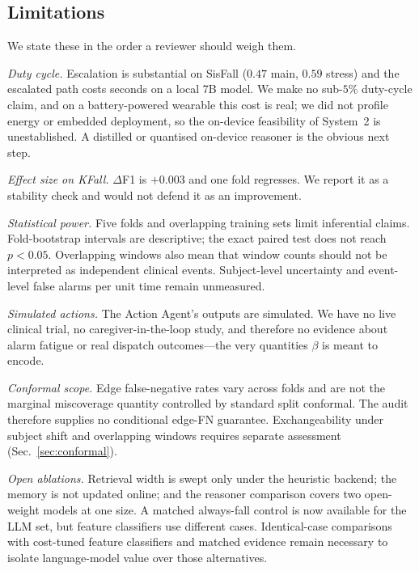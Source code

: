 \documentclass[journal]{IEEEtran}
\begin{document}


\subsection{Limitations}
\label{sec:limitations}
We state these in the order a reviewer should weigh them.

\emph{Duty cycle.} Escalation is substantial on SisFall ($0.47$ main, $0.59$ stress) and the escalated path costs seconds on a local 7B model. We make no sub-$5\%$ duty-cycle claim, and on a battery-powered wearable this cost is real; we did not profile energy or embedded deployment, so the on-device feasibility of System~2 is unestablished. A distilled or quantised on-device reasoner is the obvious next step.

\emph{Effect size on KFall.} $\Delta$F1 is $+0.003$ and one fold regresses. We report it as a stability check and would not defend it as an improvement.

\emph{Statistical power.} Five folds and overlapping training sets limit inferential claims. Fold-bootstrap intervals are descriptive; the exact paired test does not reach $p<0.05$. Overlapping windows also mean that window counts should not be interpreted as independent clinical events. Subject-level uncertainty and event-level false alarms per unit time remain unmeasured.

\emph{Simulated actions.} The Action Agent's outputs are simulated. We have no live clinical trial, no caregiver-in-the-loop study, and therefore no evidence about alarm fatigue or real dispatch outcomes---the very quantities $\beta$ is meant to encode.

\emph{Conformal scope.} Edge false-negative rates vary across folds and are not the marginal miscoverage quantity controlled by standard split conformal. The audit therefore supplies no conditional edge-FN guarantee. Exchangeability under subject shift and overlapping windows requires separate assessment (Sec.~\ref{sec:conformal}).

\emph{Open ablations.} Retrieval width is swept only under the heuristic backend; the memory is not updated online; and the reasoner comparison covers two open-weight models at one size. A matched always-fall control is now available for the LLM set, but feature classifiers use different cases. Identical-case comparisons with cost-tuned feature classifiers and matched evidence remain necessary to isolate language-model value over those alternatives.
\end{document}
